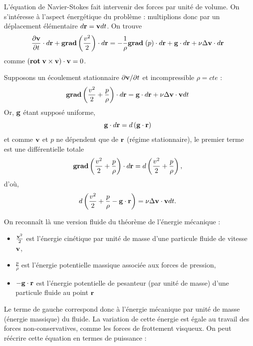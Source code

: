 \documentclass[11pt,a4paper]{report}
\begin{document}
L'équation de Navier-Stokes fait intervenir des forces par unité de volume. On s'intéresse à l'aspect énergétique du problème : multiplions donc par un déplacement élémentaire $d\bold{r} = \bold{v}dt$. On trouve
\begin{equation}
	\frac{\partial\bold{v}}{\partial t}\cdot d\bold{r} + \textbf{grad}\left(\frac{v^2}{2}\right)\cdot d\bold{r} = - \frac{1}{\rho}\textbf{grad}\;(p) \cdot d\bold{r}
	+ \bold{g}\cdot d\bold{r} + \nu\Delta\bold{v}\cdot d\bold{r}
\end{equation}
comme $\left(\textbf{rot}\;\bold{v}\times\bold{v}\right)\cdot\bold{v} = 0$. 

Supposons un écoulement stationnaire $\partial \bold{v}/\partial t$ et incompressible $\rho = cte$ :
\begin{equation}
	\textbf{grad}\left(\frac{v^2}{2} + \frac{p}{\rho} \right)\cdot d\bold{r} = \bold{g}\cdot d\bold{r} +  \nu\Delta\bold{v}\cdot \bold{v}dt
\end{equation}
Or, $\bold{g}$ étant supposé uniforme,
\begin{equation}
	\bold{g}\cdot d\bold{r} = d\left(\bold{g}\cdot\bold{r}\right)
\end{equation}
et comme $\bold{v}$ et $p$ ne dépendent que de $\bold{r}$ (régime stationnaire), le premier terme est une différentielle totale
\begin{equation}
	\textbf{grad}\left(\frac{v^2}{2} + \frac{p}{\rho} \right)\cdot d\bold{r} = d\left(\frac{v^2}{2} + \frac{p}{\rho}\right),
\end{equation}
d'où,
\begin{equation}
	d\left(\frac{v^2}{2} + \frac{p}{\rho} - \bold{g}\cdot\bold{r}\right) =  \nu\Delta\bold{v}\cdot \bold{v}dt.
\end{equation}

On reconnaît là une version fluide du théorème de l'énergie mécanique : 
\begin{itemize}
	\item $\frac{\bold{v}^2}{2}$ est l'énergie cinétique par unité de masse d'une particule fluide de vitesse $\bold{v}$,
	\item $\frac{p}{\rho}$ est l'énergie potentielle massique associée aux forces de pression, 
	\item $- \bold{g}\cdot\bold{r}$ est l'énergie potentielle de pesanteur (par unité de masse) d'une particule fluide au point $\bold{r}$  
\end{itemize}

Le terme de gauche correspond donc à l'énergie mécanique par unité de masse (énergie massique) du fluide. La variation de cette énergie est égale au travail des forces non-conservatives, comme les forces de frottement visqueux. On peut réécrire cette équation en termes de puissance :
\end{document}

